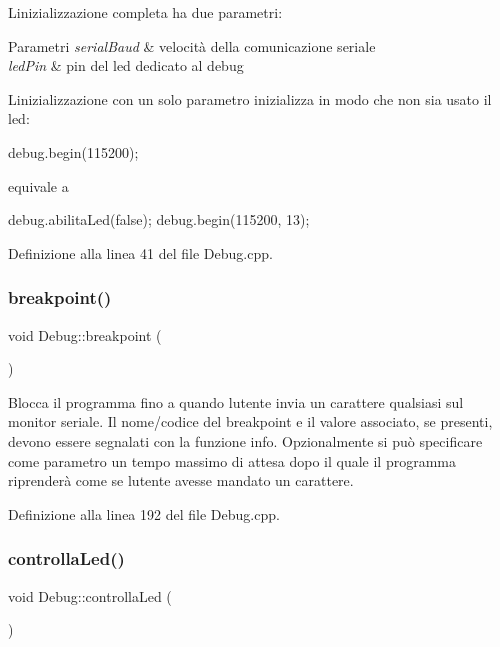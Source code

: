 L\textquotesingle{}inizializzazione completa ha due parametri\+: 
\begin{DoxyParams}{Parametri}
{\em serial\+Baud} & velocità della comunicazione seriale \\
\hline
{\em led\+Pin} & pin del led dedicato al debug\\
\hline
\end{DoxyParams}
L\textquotesingle{}inizializzazione con un solo parametro inizializza in modo che non sia usato il led\+: 
\begin{DoxyCode}
debug.begin(115200);
\end{DoxyCode}
 equivale a 
\begin{DoxyCode}
debug.abilitaLed(\textcolor{keyword}{false});
debug.begin(115200, 13);
\end{DoxyCode}
 

Definizione alla linea 41 del file Debug.\+cpp.

\mbox{\label{class_debug_a3a24898e3ca48ef89e2029ab6e43665c}} 
\subsubsection{\texorpdfstring{breakpoint()}{breakpoint()}}
{\footnotesize\ttfamily void Debug\+::breakpoint (\begin{DoxyParamCaption}{ }\end{DoxyParamCaption})}

Blocca il programma fino a quando l\textquotesingle{}utente invia un carattere qualsiasi sul monitor seriale. Il nome/codice del breakpoint e il valore associato, se presenti, devono essere segnalati con la funzione info. Opzionalmente si può specificare come parametro un tempo massimo di attesa dopo il quale il programma riprenderà come se l\textquotesingle{}utente avesse mandato un carattere. 

Definizione alla linea 192 del file Debug.\+cpp.

\mbox{\label{class_debug_a63cf78c0389f81d066418c1c25d2d21d}} 
\subsubsection{\texorpdfstring{controlla\+Led()}{controllaLed()}}
{\footnotesize\ttfamily void Debug\+::controlla\+Led (\begin{DoxyParamCaption}{ }\end{DoxyParamCaption})}


